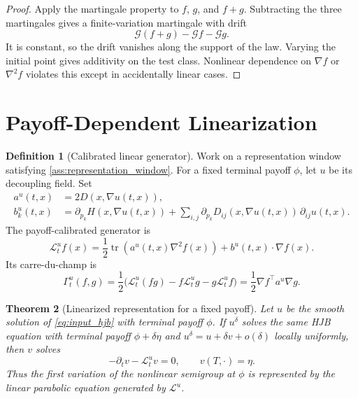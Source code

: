 \documentclass[11pt]{amsart}
\newtheorem{theorem}{Theorem}[section]
\theoremstyle{definition}
\newtheorem{definition}[theorem]{Definition}
\theoremstyle{remark}
\newcommand{\Lcal}{\mathcal L}
\newcommand{\Gcal}{\mathcal G}
\newcommand{\Tr}{\operatorname{tr}}
\begin{document}
\begin{proof}
Apply the martingale property to $f$, $g$, and $f+g$.  Subtracting the three
martingales gives a finite-variation martingale with drift
\[
  \Gcal(f+g)-\Gcal f-\Gcal g .
\]
It is constant, so the drift vanishes along the support of the law.  Varying
the initial point gives additivity on the test class.  Nonlinear dependence on
$\nabla f$ or $\nabla^2 f$ violates this except in accidentally linear cases.
\end{proof}

\section{Payoff-Dependent Linearization}

\begin{definition}[Calibrated linear generator]
\label{def:calibrated_linear_generator}
Work on a representation window satisfying
\cref{ass:representation_window}.  For a fixed terminal payoff \(\phi\), let
\(u\) be its decoupling field.  Set
\begin{align}
  a^u(t,x)&=2D(x,\nabla u(t,x)),\\
  b^u_k(t,x)&=\partial_{p_k}H(x,\nabla u(t,x))
  +\sum_{i,j}\partial_{p_k}D_{ij}(x,\nabla u(t,x))\,\partial_{ij}u(t,x).
\end{align}
The payoff-calibrated generator is
\begin{equation}
  \Lcal_t^u f(x)=\frac12\Tr(a^u(t,x)\nabla^2 f(x))
  +b^u(t,x)\cdot\nabla f(x).
\end{equation}
Its carre-du-champ is
\begin{equation}
  \Gamma_t^u(f,g)
  =\frac12\bigl(\Lcal_t^u(fg)-f\Lcal_t^ug-g\Lcal_t^uf\bigr)
  =\frac12\nabla f^\top a^u\nabla g.
\end{equation}
\end{definition}

\begin{theorem}[Linearized representation for a fixed payoff]
\label{thm:linearized_representation}
Let $u$ be the smooth solution of \eqref{eq:input_hjb} with terminal payoff
$\phi$.  If $u^\delta$ solves the same HJB equation with terminal payoff
$\phi+\delta\eta$ and $u^\delta=u+\delta v+o(\delta)$ locally uniformly, then
$v$ solves
\begin{equation}
  -\partial_t v-\Lcal_t^u v=0,\qquad v(T,\cdot)=\eta .
\end{equation}
Thus the first variation of the nonlinear semigroup at $\phi$ is represented
by the linear parabolic equation generated by $\Lcal^u$.
\end{theorem}
\end{document}
